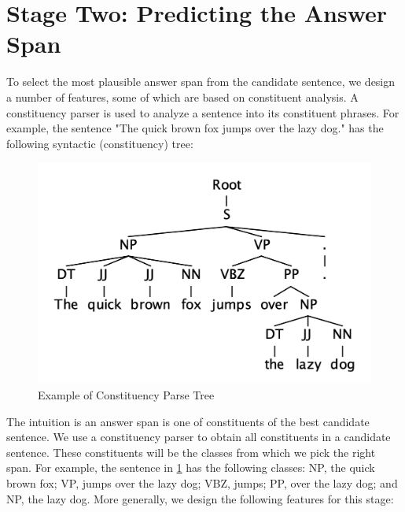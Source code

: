 \newpage

\section{Stage Two: Predicting the Answer Span}

To select the most plausible answer span from the candidate sentence, we design a number of features, some of which are based on constituent analysis. A constituency parser is used to analyze a sentence into its constituent phrases. For example, the sentence "The quick brown fox jumps over the lazy dog." has the following syntactic (constituency) tree:

\begin{figure}[hbtp]
\centering
\includegraphics[scale=.2]{../Figures/syntax_tree_example.png}
\caption{Example of Constituency Parse Tree}
\label{fig:parsetree}
\end{figure}



The intuition is an answer span is one of constituents of the best candidate sentence. We use a constituency parser \citep{Kitaev2018} to obtain all constituents in a candidate sentence. These constituents will be the classes from which we pick the right span. For example, the sentence in \ref{fig:parsetree} has the following classes: NP, the quick brown fox; VP, jumps over the lazy dog; VBZ, jumps; PP, over the lazy dog; and NP, the lazy dog. More generally, we design the following features for this stage:

